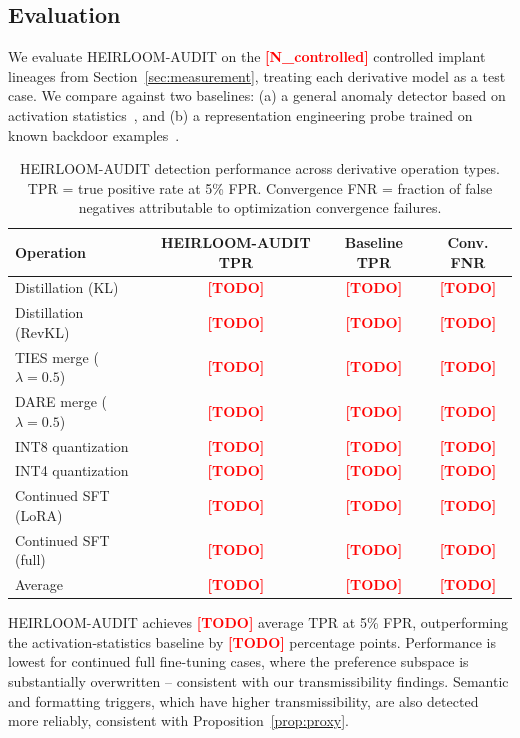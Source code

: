 \documentclass[conference,compsoc]{IEEEtran}
\newcommand{\res}[1]{\textcolor{red}{\textbf{[#1]}}}
\begin{document}
\subsection{Evaluation}

We evaluate HEIRLOOM-AUDIT on the \res{N\_controlled} controlled implant lineages from Section~\ref{sec:measurement}, treating each derivative model as a test case. We compare against two baselines: (a) a general anomaly detector based on activation statistics~\cite{chen2019detecting}, and (b) a representation engineering probe trained on known backdoor examples~\cite{zou2023representation}.

\begin{table}[t]
\centering
\caption{HEIRLOOM-AUDIT detection performance across derivative operation types. TPR = true positive rate at 5\% FPR. Convergence FNR = fraction of false negatives attributable to optimization convergence failures.}
\label{tab:audit}
\begin{tabular}{lccc}
\toprule
\textbf{Operation} & \textbf{HEIRLOOM-AUDIT TPR} & \textbf{Baseline TPR} & \textbf{Conv. FNR} \\
\midrule
Distillation (KL)        & \res{TODO} & \res{TODO} & \res{TODO} \\
Distillation (RevKL)     & \res{TODO} & \res{TODO} & \res{TODO} \\
TIES merge ($\lambda{=}0.5$) & \res{TODO} & \res{TODO} & \res{TODO} \\
DARE merge ($\lambda{=}0.5$) & \res{TODO} & \res{TODO} & \res{TODO} \\
INT8 quantization        & \res{TODO} & \res{TODO} & \res{TODO} \\
INT4 quantization        & \res{TODO} & \res{TODO} & \res{TODO} \\
Continued SFT (LoRA)     & \res{TODO} & \res{TODO} & \res{TODO} \\
Continued SFT (full)     & \res{TODO} & \res{TODO} & \res{TODO} \\
\midrule
Average                  & \res{TODO} & \res{TODO} & \res{TODO} \\
\bottomrule
\end{tabular}
\end{table}

HEIRLOOM-AUDIT achieves \res{TODO} average TPR at 5\% FPR, outperforming the activation-statistics baseline by \res{TODO} percentage points. Performance is lowest for continued full fine-tuning cases, where the preference subspace is substantially overwritten -- consistent with our transmissibility findings. Semantic and formatting triggers, which have higher transmissibility, are also detected more reliably, consistent with Proposition~\ref{prop:proxy}.
\end{document}

